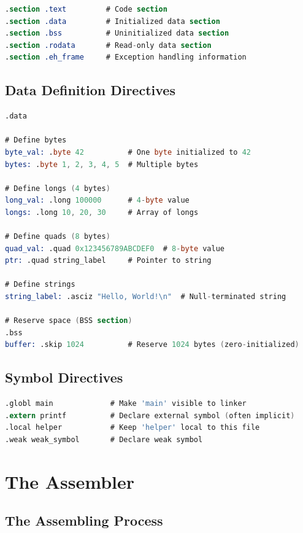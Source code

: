\begin{lstlisting}[language=nasm]
.section .text         # Code section
.section .data         # Initialized data section
.section .bss          # Uninitialized data section
.section .rodata       # Read-only data section
.section .eh_frame     # Exception handling information
\end{lstlisting}

\subsection{Data Definition Directives}

\begin{lstlisting}[language=nasm]
.data

# Define bytes
byte_val: .byte 42          # One byte initialized to 42
bytes: .byte 1, 2, 3, 4, 5  # Multiple bytes

# Define longs (4 bytes)
long_val: .long 100000      # 4-byte value
longs: .long 10, 20, 30     # Array of longs

# Define quads (8 bytes)
quad_val: .quad 0x123456789ABCDEF0  # 8-byte value
ptr: .quad string_label     # Pointer to string

# Define strings
string_label: .asciz "Hello, World!\n"  # Null-terminated string

# Reserve space (BSS section)
.bss
buffer: .skip 1024          # Reserve 1024 bytes (zero-initialized)
\end{lstlisting}

\subsection{Symbol Directives}

\begin{lstlisting}[language=nasm]
.globl main             # Make 'main' visible to linker
.extern printf          # Declare external symbol (often implicit)
.local helper           # Keep 'helper' local to this file
.weak weak_symbol       # Declare weak symbol
\end{lstlisting}

\section{The Assembler}

\subsection{The Assembling Process}

